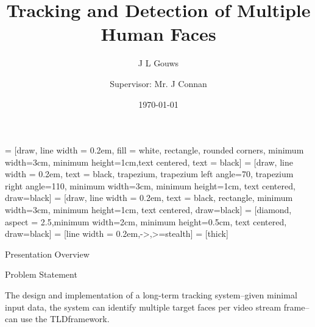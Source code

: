 \documentclass[mathserif, 14pt, xcolor=svgnames]{beamer}
\title{Tracking and Detection of Multiple Human Faces }
\subtitle{}
\author[Gouws]{J L Gouws\inst{1}\\[1ex]  \and {\small Supervisor: Mr. J Connan\inst{1}}}
\date{\today}
\institute[RU]{\inst{1} Rhodes University}
\begin{document}
\begin{frame}
   \maketitle
\end{frame}

\usetikzlibrary{shapes.geometric, arrows}

 = [draw, line width = 0.2em, fill = white, rectangle, rounded corners, minimum width=3cm, minimum height=1cm,text centered, text = black]
 = [draw, line width = 0.2em, text = black, trapezium, trapezium left angle=70, trapezium right angle=110, minimum width=3cm, minimum height=1cm, text centered, draw=black]
 = [draw, line width = 0.2em, text = black, rectangle, minimum width=3cm, minimum height=1cm, text centered, draw=black]
 = [diamond, aspect = 2.5,minimum width=2cm, minimum height=0.5cm, text centered, draw=black]
 = [line width = 0.2em,->,>=stealth]
 = [thick]

\bgroup
\begin{frame}{Presentation Overview}
  \centering
\end{frame}
\egroup

\bgroup
\begin{frame}{Problem Statement}
  \begin{minipage}[t]{\textwidth}
  { \Large
    The design and implementation of a long-term tracking system--given minimal input data,
    the system can identify multiple target faces per video stream frame--can use the TLD\footnotemark[1] framework.
  }
  \end{minipage}
\end{frame}
\egroup
\end{document}
